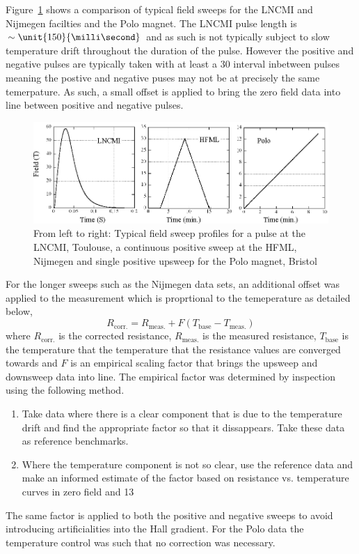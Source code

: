 Figure~\ref{Fig:Exp:ComparisonFieldSweeps} shows a comparison of typical field sweeps for the \ac{LNCMI} and Nijmegen facilties and the Polo magnet. The \ac{LNCMI} pulse length is $\sim\unit{150}{\milli\second}$ and as such is not typically subject to slow temperature drift throughout the duration of the pulse. However the positive and negative pulses are typically taken with at least a \unit{30}{\minute} interval inbetween pulses meaning the postive and negative puses may not be at precisely the same temerpature. As such, a small offset is applied to bring the zero field data into line between positive and negative pulses.
\begin{figure}[htbp]
    \begin{center}
        \includegraphics[scale=0.9]{Chapter-ExperimentalTechnique/Figures/ComparisonFieldSweeps/ComparisonFieldSweeps}
        \caption{From left to right: Typical field sweep profiles for a pulse at the \ac{LNCMI}, Toulouse, a continuous positive sweep at the \ac{HFML}, Nijmegen and single positive upsweep for the Polo magnet, Bristol}
        \label{Fig:Exp:ComparisonFieldSweeps}
    \end{center}
\end{figure}
For the longer sweeps such as the Nijmegen data sets, an additional offset was applied to the measurement which is proprtional to the temeperature as detailed below,
\begin{equation}
    R_{\textrm{corr.}} = R_{\textrm{meas.}} + F(T_{\textrm{base}} - T_{\textrm{meas.}})
\end{equation}
where $R_{\textrm{corr.}}$ is the corrected resistance, $R_{\textrm{meas.}}$ is the measured resistance, $T_{\textrm{base}}$ is the temperature that the temperature that the resistance values are converged towards and $F$ is an empirical scaling factor that brings the upsweep and downsweep data into line. The empirical factor was determined by inspection using the following method.
\begin{enumerate}
\item Take data where there is a clear component that is due to the temperature drift and find the appropriate factor so that it dissappears. Take these data as reference benchmarks.
\item Where the temperature component is not so clear, use the reference data and make an informed estimate of the factor based on resistance vs. temperature curves in zero field and \unit{13}{\tesla}
\end{enumerate}
The same factor is applied to both the positive and negative sweeps to avoid introducing artificialities into the Hall gradient. For the Polo data the temperature control was such that no correction was necessary.

